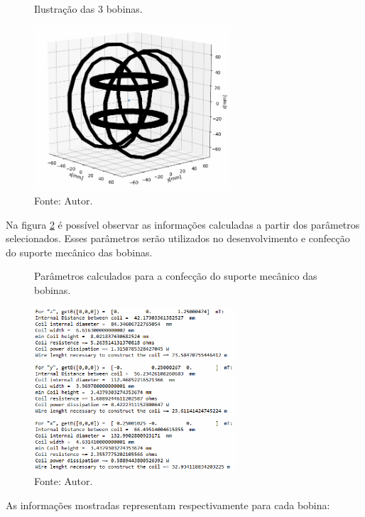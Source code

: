 \begin{figure}[H]
    \centering
     \caption{Ilustração das 3 bobinas.}
     \includegraphics[width=0.65\textwidth]{./img/simulacao/desenhoCoil3D.png}
     \caption*{Fonte: Autor.}\label{fig:3dcoil}
\end{figure}

Na figura \ref{fig:cons} é possível observar as informações calculadas a partir dos parâmetros selecionados. Esses parâmetros serão utilizados no desenvolvimento e confecção do suporte mecânico das bobinas.

\begin{figure}[H]
    \centering
     \caption{Parâmetros calculados para a confecção do suporte mecânico das bobinas.}
     \includegraphics[width=0.67\textwidth]{./img/simulacao/console.png}
     \caption*{Fonte: Autor.}\label{fig:cons}
\end{figure}

As informações mostradas representam respectivamente para cada bobina:

